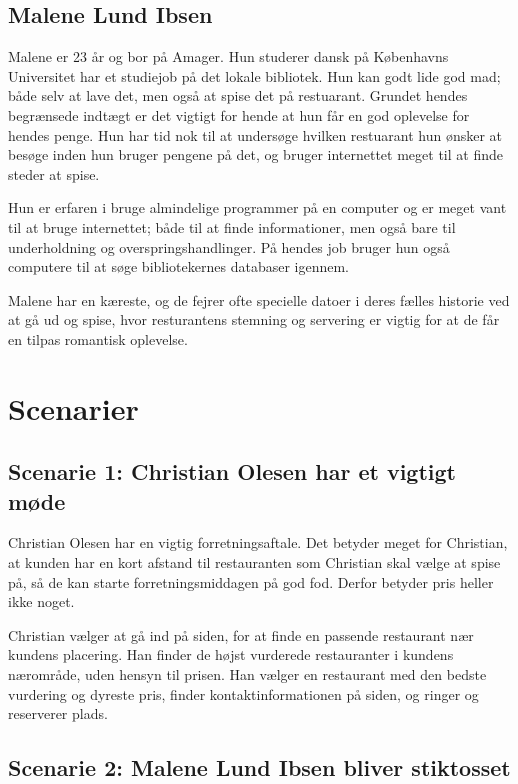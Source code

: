 \documentclass[a4paper, 12pt]{article}
\begin{document}
\subsection{Malene Lund Ibsen}
Malene er 23 år og bor på Amager. Hun studerer dansk på Københavns Universitet
har et studiejob på det lokale bibliotek. Hun kan godt lide god mad; både selv
at lave det, men også at spise det på restuarant. Grundet hendes begrænsede
indtægt er det vigtigt for hende at hun får en god oplevelse for hendes penge.
Hun har tid nok til at undersøge hvilken restuarant hun ønsker at besøge inden
hun bruger pengene på det, og bruger internettet meget til at finde steder at
spise.

Hun er erfaren i bruge almindelige programmer på en computer og er meget vant
til at bruge internettet; både til at finde informationer, men også bare til
underholdning og overspringshandlinger. På hendes job bruger hun også computere
til at søge bibliotekernes databaser igennem. 

Malene har en kæreste, og de fejrer ofte specielle datoer i deres fælles
historie ved at gå ud og spise, hvor resturantens stemning og servering er
vigtig for at de får en tilpas romantisk oplevelse.

\section{Scenarier}
\label{sec:Scenarier}

\subsection{Scenarie 1: Christian Olesen har et vigtigt møde}
\label{sub:Scenarie 1: Christian Olesen}
Christian Olesen har en vigtig forretningsaftale. Det betyder meget for
Christian, at kunden har en kort afstand til restauranten som Christian skal
vælge at spise på, så de kan starte forretningsmiddagen på god fod. Derfor
betyder pris heller ikke noget.

Christian vælger at gå ind på siden, for at finde en passende restaurant nær
kundens placering. Han finder de højst vurderede restauranter i kundens
nærområde, uden hensyn til prisen. Han vælger en restaurant med den bedste
vurdering og dyreste pris, finder kontaktinformationen på siden, og ringer og
reserverer plads.

\subsection{Scenarie 2: Malene Lund Ibsen bliver stiktosset}
\label{sub:Scenarie 2: Malene Lund Ibsen}
\end{document}
